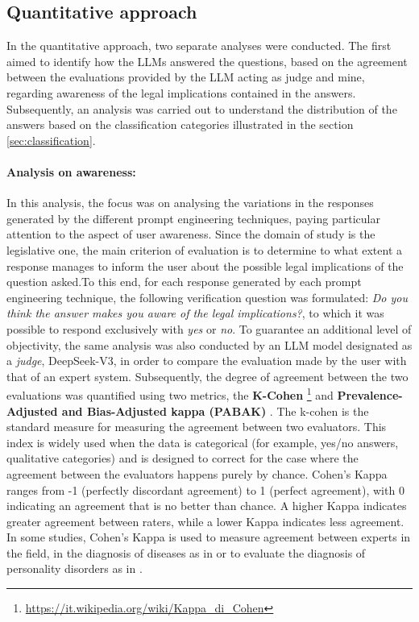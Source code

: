 \subsection{Quantitative approach}
In the quantitative approach, two separate analyses were conducted. The first aimed to identify how the LLMs answered the questions, based on the agreement between the evaluations provided by the LLM acting as judge and mine, regarding awareness of the legal implications contained in the answers. Subsequently, an analysis was carried out to understand the distribution of the answers based on the classification categories illustrated in the section \ref{sec:classification}.
\paragraph{Analysis on awareness:} 
In this analysis, the focus was on analysing the variations in the responses generated by the different prompt engineering techniques, paying particular attention to the aspect of user awareness. Since the domain of study is the legislative one, the main criterion of evaluation is to determine to what extent a response manages to inform the user about the possible legal implications of the question asked.To this end, for each response generated by each prompt engineering technique, the following verification question was formulated: \textit{Do you think the answer makes you aware of the legal implications?}, to which it was possible to respond exclusively with \textit{yes} or \textit{no}. To guarantee an additional level of objectivity, the same analysis was also conducted by an LLM model designated as a \textit{judge}, DeepSeek-V3, in order to compare the evaluation made by the user with that of an expert system.
Subsequently, the degree of agreement between the two evaluations was quantified using two metrics, the \textbf{K-Cohen} \footnote{\url{https://it.wikipedia.org/wiki/Kappa_di_Cohen}} and \textbf{Prevalence-Adjusted and Bias-Adjusted kappa (PABAK)} \cite{Pabak}.
The k-cohen is the standard measure for measuring the agreement between two evaluators. This index is widely used when the data is categorical (for example, yes/no answers, qualitative categories) and is designed to correct for the case where the agreement between the evaluators happens purely by chance. Cohen's Kappa ranges from -1 (perfectly discordant agreement) to 1 (perfect agreement), with 0 indicating an agreement that is no better than chance. A higher Kappa indicates greater agreement between raters, while a lower Kappa indicates less agreement.
In some studies, Cohen's Kappa is used to measure agreement between experts in the field, in the diagnosis of diseases as in \cite{wongpakaran2013comparison} or to evaluate the diagnosis of personality disorders as in \cite{luciano2019field}.\\

